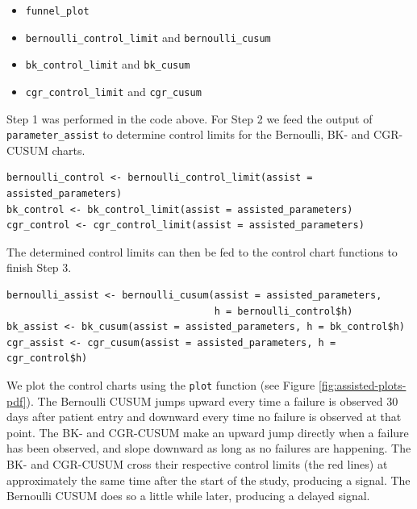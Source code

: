\begin{itemize}
\tightlist
\item
  \texttt{funnel\_plot}
\item
  \texttt{bernoulli\_control\_limit} and \texttt{bernoulli\_cusum}
\item
  \texttt{bk\_control\_limit} and \texttt{bk\_cusum}
\item
  \texttt{cgr\_control\_limit} and \texttt{cgr\_cusum}
\end{itemize}

Step 1 was performed in the code above. For Step 2 we feed the output of \texttt{parameter\_assist} to determine control limits for the Bernoulli, BK- and CGR-CUSUM charts.

\begin{verbatim}
bernoulli_control <- bernoulli_control_limit(assist = assisted_parameters)
bk_control <- bk_control_limit(assist = assisted_parameters)
cgr_control <- cgr_control_limit(assist = assisted_parameters)
\end{verbatim}

The determined control limits can then be fed to the control chart functions to finish Step 3.

\begin{verbatim}
bernoulli_assist <- bernoulli_cusum(assist = assisted_parameters, 
                                    h = bernoulli_control$h)
bk_assist <- bk_cusum(assist = assisted_parameters, h = bk_control$h)
cgr_assist <- cgr_cusum(assist = assisted_parameters, h = cgr_control$h)
\end{verbatim}

We plot the control charts using the \texttt{plot} function (see Figure \ref{fig:assisted-plots-pdf}). The Bernoulli CUSUM jumps upward every time a failure is observed \(30\) days after patient entry and downward every time no failure is observed at that point. The BK- and CGR-CUSUM make an upward jump directly when a failure has been observed, and slope downward as long as no failures are happening. The BK- and CGR-CUSUM cross their respective control limits (the red lines) at approximately the same time after the start of the study, producing a signal. The Bernoulli CUSUM does so a little while later, producing a delayed signal.

